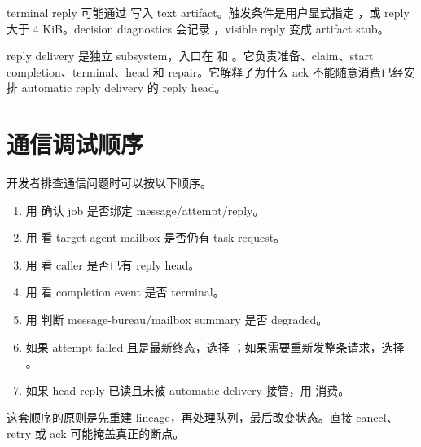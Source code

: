 terminal reply 可能通过  写入 text artifact。触发条件是用户显式指定 ，或 reply 大于 4 KiB。decision diagnostics 会记录 ，visible reply 变成 artifact stub。

reply delivery 是独立 subsystem，入口在  和 。它负责准备、claim、start completion、terminal、head 和 repair。它解释了为什么 ack 不能随意消费已经安排 automatic reply delivery 的 reply head。

\section{通信调试顺序}

开发者排查通信问题时可以按以下顺序。

\begin{enumerate}
  \item 用  确认 job 是否绑定 message/attempt/reply。
  \item 用  看 target agent mailbox 是否仍有 task request。
  \item 用  看 caller 是否已有 reply head。
  \item 用  看 completion event 是否 terminal。
  \item 用  判断 message-bureau/mailbox summary 是否 degraded。
  \item 如果 attempt failed 且是最新终态，选择 ；如果需要重新发整条请求，选择 。
  \item 如果 head reply 已读且未被 automatic delivery 接管，用  消费。
\end{enumerate}

这套顺序的原则是先重建 lineage，再处理队列，最后改变状态。直接 cancel、retry 或 ack 可能掩盖真正的断点。
